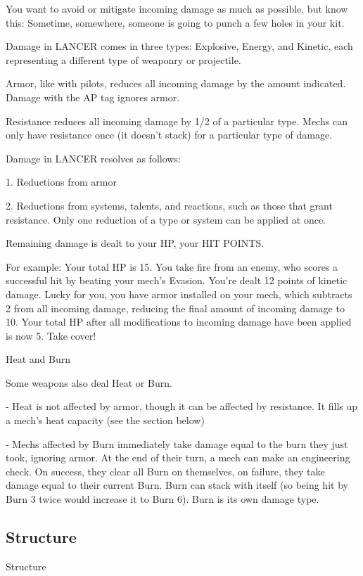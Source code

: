 You want to avoid or mitigate incoming damage as much as possible, but know this: Sometime,
somewhere, someone is going to punch a few holes in your kit.


Damage in LANCER comes in three types: Explosive, Energy, and Kinetic, each representing a
different type of weaponry or projectile.


Armor, like with pilots, reduces all incoming damage by the amount indicated. Damage with the
AP tag ignores armor.

Resistance reduces all incoming damage by 1/2 of a particular type. Mechs can only have
resistance once (it doesn’t stack) for a particular type of damage.


Damage in LANCER resolves as follows:

             1.  Reductions from armor

             2.  Reductions from systems, talents, and reactions, such as those that grant
                 resistance. Only one reduction of a type or system can be applied at once.

Remaining damage is dealt to your HP, your HIT POINTS.


For example: Your total HP is  15. You take fire from an enemy, who scores a successful hit by
beating your mech’s Evasion. You’re dealt 12 points of kinetic damage. Lucky for you, you have
armor installed on your mech, which subtracts 2 from all incoming damage, reducing the final
amount of incoming damage to  10. Your total HP after all modifications to incoming damage
have been applied is now 5. Take cover!

                                               Heat and Burn

Some weapons also deal Heat or Burn.

    -    Heat is not affected by armor, though it can be affected by resistance. It fills up a mech’s
         heat capacity (see the section below)

    -    Mechs affected by Burn immediately take damage equal to the burn they just took,
         ignoring armor. At the end of their turn, a mech can make an engineering check. On
        success, they clear all Burn on themselves, on failure, they take damage equal to their
        current Burn. Burn can stack with itself (so being hit by Burn 3 twice would increase it to
         Burn 6). Burn is its own damage type.

\subsection{Structure}
                                                Structure

